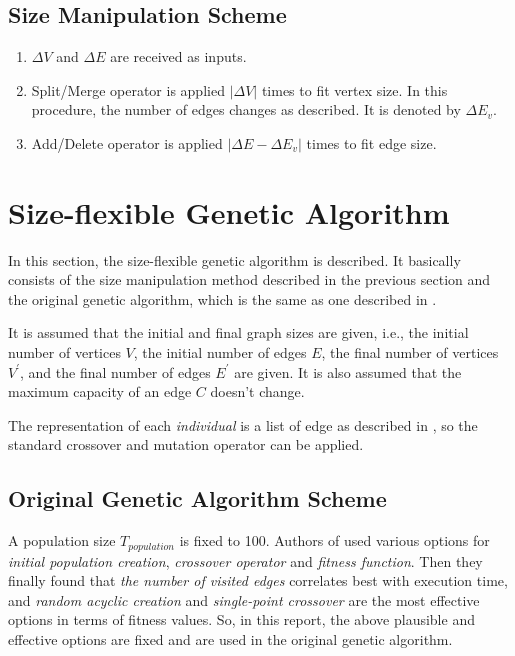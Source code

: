 \documentclass[a4paper, 10pt, conference]{ieeeconf}      %
\begin{document}
\subsection{Size Manipulation Scheme}
\begin{enumerate}
\item $\Delta V$ and $\Delta E$ are received as inputs.
\item Split/Merge operator is applied $\vert \Delta V \vert$ times to fit vertex size. In this procedure, the number of edges changes as described. It is denoted by $\Delta E_v$.
\item Add/Delete operator is applied $\vert \Delta E - \Delta E_v\vert$ times to fit edge size.
\end{enumerate}

\section{Size-flexible Genetic Algorithm}
In this section, the size-flexible genetic algorithm is described. It basically consists of the size manipulation method described in the previous section and the original genetic algorithm, which is the same as one described in \cite{c1}.

It is assumed that the initial and final graph sizes are given, i.e., the initial number of vertices $V$, the initial number of edges $E$, the final number of vertices $V^\prime$, and the final number of edges $E^\prime$ are given. It is also assumed that the maximum capacity of an edge $C$ doesn't change.

The representation of each \textit{individual} is a list of edge as described in \cite{c1}, so the standard crossover and mutation operator can be applied.

\subsection{Original Genetic Algorithm Scheme}
A population size $T_{population}$ is fixed to 100. Authors of \cite{c1} used various options for \textit{initial population creation}, \textit{crossover operator} and \textit{fitness function}. Then they finally found that \textit{the number of visited edges} correlates best with execution time, and \textit{random acyclic creation} and \textit{single-point crossover} are the most effective options in terms of fitness values. So, in this report, the above plausible and effective options are fixed and are used in the original genetic algorithm.
\end{document}
